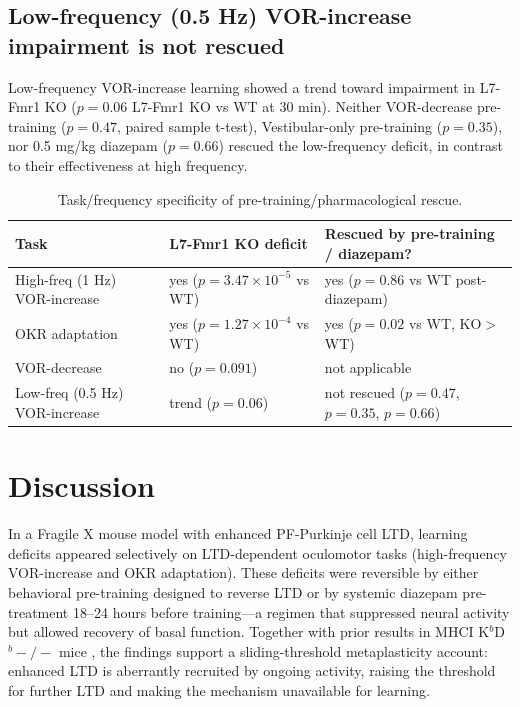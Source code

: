 \documentclass[11pt]{article}
\begin{document}
\subsection{Low-frequency (0.5 Hz) VOR-increase impairment is not rescued}
Low-frequency VOR-increase learning showed a trend toward impairment in L7-Fmr1 KO ($p = 0.06$ L7-Fmr1 KO vs WT at 30 min). Neither VOR-decrease pre-training ($p = 0.47$, paired sample t-test), Vestibular-only pre-training ($p = 0.35$), nor 0.5 mg/kg diazepam ($p = 0.66$) rescued the low-frequency deficit, in contrast to their effectiveness at high frequency.

\begin{table}[h]
\centering
\caption{Task/frequency specificity of pre-training/pharmacological rescue.}
\begin{tabular}{lll}
\toprule
Task & L7-Fmr1 KO deficit & Rescued by pre-training / diazepam? \\
\midrule
High-freq (1 Hz) VOR-increase & yes ($p = 3.47\times10^{-5}$ vs WT) & yes ($p = 0.86$ vs WT post-diazepam) \\
OKR adaptation & yes ($p = 1.27\times10^{-4}$ vs WT) & yes ($p = 0.02$ vs WT, KO$>$WT) \\
VOR-decrease & no ($p = 0.091$) & not applicable \\
Low-freq (0.5 Hz) VOR-increase & trend ($p = 0.06$) & not rescued ($p = 0.47$, $p = 0.35$, $p = 0.66$) \\
\bottomrule
\end{tabular}
\end{table}

\section{Discussion}
In a Fragile X mouse model with enhanced PF-Purkinje cell LTD, learning deficits appeared selectively on LTD-dependent oculomotor tasks (high-frequency VOR-increase and OKR adaptation). These deficits were reversible by either behavioral pre-training designed to reverse LTD or by systemic diazepam pre-treatment 18--24 hours before training---a regimen that suppressed neural activity but allowed recovery of basal function. Together with prior results in MHCI K$^b$D$^b-/-$ mice \cite{nguyenvu2017saturation}, the findings support a sliding-threshold metaplasticity \cite{bienenstock1982theory,leet2022molecular} account: enhanced LTD is aberrantly recruited by ongoing activity, raising the threshold for further LTD and making the mechanism unavailable for learning.
\end{document}
